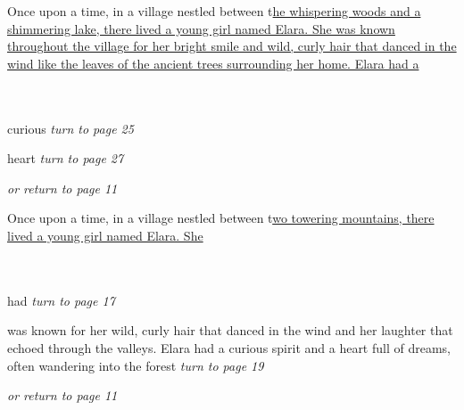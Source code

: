 \documentclass{memoir}
\begin{document}
        


        \hspace{1cm}\vfill
        \begin{minipage}{3in}
        \LARGE
        Once upon a time, in a village nestled between t\ul{he whispering woods and a shimmering lake, there lived a young girl named Elara. She was known throughout the village for her bright smile and wild, curly hair that danced in the wind like the leaves of the ancient trees surrounding her home. Elara had a}\\ \vspace{5mm} \\
  \\ 

        \hspace{1cm}\begin{minipage}{6cm}
        \normalsize
            curious \hfill \textit{turn to page 25}\\ \vspace{5mm}

heart \hfill \textit{turn to page 27}\\ \vspace{5mm}

\hfill \textit{or return to page 11}
        \end{minipage} 
        \end{minipage}
        \hspace{1cm}\vfill
        \cleardoublepage

        


        \hspace{1cm}\vfill
        \begin{minipage}{3in}
        \LARGE
        Once upon a time, in a village nestled between t\ul{wo towering mountains, there lived a young girl named Elara. She}\\ \vspace{5mm} \\
  \\ 

        \hspace{1cm}\begin{minipage}{6cm}
        \normalsize
            had  \hfill \textit{turn to page 17}\\ \vspace{5mm}

was known for her wild, curly hair that danced in the wind and her laughter that echoed through the valleys. Elara had a curious spirit and a heart full of dreams, often wandering into the forest \hfill \textit{turn to page 19}\\ \vspace{5mm}

\hfill \textit{or return to page 11}
        \end{minipage} 
        \end{minipage}
        \hspace{1cm}\vfill
        \cleardoublepage
\end{document}
